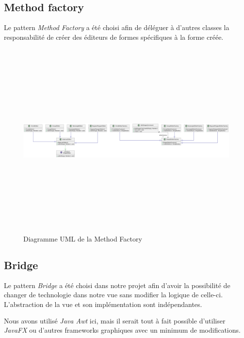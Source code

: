 \documentclass{article}
\begin{document}
\subsection{Method factory}
Le pattern \textit{Method Factory} a été choisi afin de déléguer à d'autres classes la responsabilité de créer des éditeurs de formes
spécifiques à la forme créée.
\begin{figure}[h]
    \centering
    \includegraphics[width=\textwidth,height=10.0cm,keepaspectratio]{methodFactory.png}
    \caption{Diagramme UML de la Method Factory}
    \label{MethodFactory}
\end{figure}
\FloatBarrier
\subsection{Bridge}

Le pattern \textit{Bridge} a été choisi dans notre projet afin d'avoir la possibilité de changer de technologie dans notre vue
 sans modifier la logique de celle-ci. L'abstraction de la vue et son implémentation sont indépendantes.

Nous avons utilisé \textit{Java Awt} ici, mais il serait tout à fait possible d'utiliser \textit{JavaFX} ou d'autres frameworks graphiques
avec un minimum de modifications.
\end{document}
